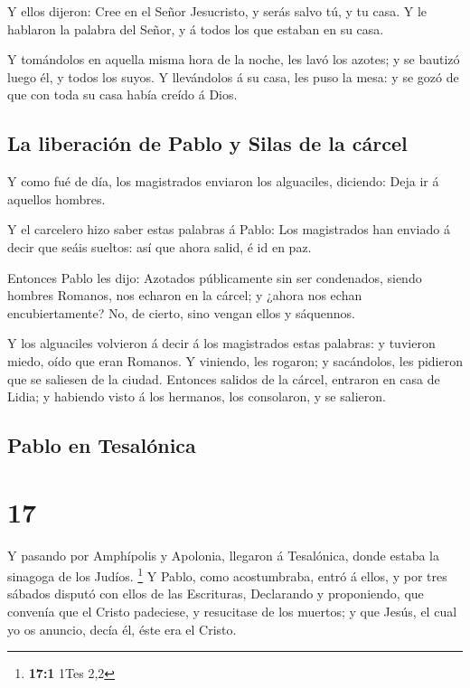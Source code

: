  Y ellos dijeron: Cree en el Señor Jesucristo, y serás
salvo tú, y tu casa.  Y le hablaron la palabra del Señor,
y á todos los que estaban en su casa.

 Y tomándolos en aquella misma hora de la noche, les lavó
los azotes; y se bautizó luego él, y todos los suyos.  Y
llevándolos á su casa, les puso la mesa: y se gozó de que con toda su
casa había creído á Dios.

\hypertarget{la-liberaciuxf3n-de-pablo-y-silas-de-la-cuxe1rcel}{%
\subsection{La liberación de Pablo y Silas de la
cárcel}\label{la-liberaciuxf3n-de-pablo-y-silas-de-la-cuxe1rcel}}

 Y como fué de día, los magistrados enviaron los
alguaciles, diciendo: Deja ir á aquellos hombres.

 Y el carcelero hizo saber estas palabras á Pablo: Los
magistrados han enviado á decir que seáis sueltos: así que ahora salid,
é id en paz.

 Entonces Pablo les dijo: Azotados públicamente sin ser
condenados, siendo hombres Romanos, nos echaron en la cárcel; y ¿ahora
nos echan encubiertamente? No, de cierto, sino vengan ellos y sáquennos.

 Y los alguaciles volvieron á decir á los magistrados
estas palabras: y tuvieron miedo, oído que eran Romanos. 
Y viniendo, les rogaron; y sacándolos, les pidieron que se saliesen de
la ciudad.  Entonces salidos de la cárcel, entraron en
casa de Lidia; y habiendo visto á los hermanos, los consolaron, y se
salieron.

\hypertarget{pablo-en-tesaluxf3nica}{%
\subsection{Pablo en Tesalónica}\label{pablo-en-tesaluxf3nica}}

\hypertarget{section-16}{%
\section{17}\label{section-16}}

 Y pasando por Amphípolis y Apolonia, llegaron á
Tesalónica, donde estaba la sinagoga de los Judíos. \footnote{\textbf{17:1}
  1Tes 2,2}  Y Pablo, como acostumbraba, entró á ellos, y
por tres sábados disputó con ellos de las Escrituras, 
Declarando y proponiendo, que convenía que el Cristo padeciese, y
resucitase de los muertos; y que Jesús, el cual yo os anuncio, decía él,
éste era el Cristo.

